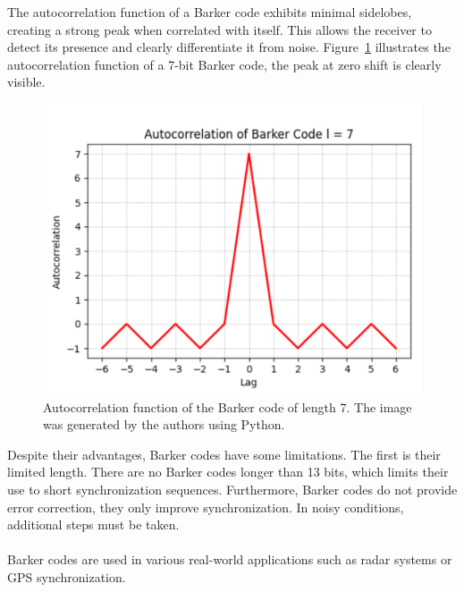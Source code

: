 The autocorrelation function of a Barker code exhibits minimal sidelobes, creating a strong peak when correlated with itself. This allows the receiver to detect its presence and clearly differentiate it from noise. Figure~\ref{fig:barker_code} illustrates the autocorrelation function of a 7-bit Barker code, the peak at zero shift is clearly visible.
\begin{figure}[h]
    \centering
    \includegraphics[scale=0.45]{images/ugly_barker_code.PNG}
    \caption{Autocorrelation function of the Barker code of length 7. The image was generated by the authors using Python.}
    \label{fig:barker_code}
\end{figure}
Despite their advantages, Barker codes have some limitations. The first is their limited length. There are no Barker codes longer than 13 bits, which limits their use to short synchronization sequences. Furthermore, Barker codes do not provide error correction, they only improve synchronization. In noisy conditions, additional steps must be taken.
\\ \\
Barker codes are used in various real-world applications such as radar systems or GPS synchronization.

